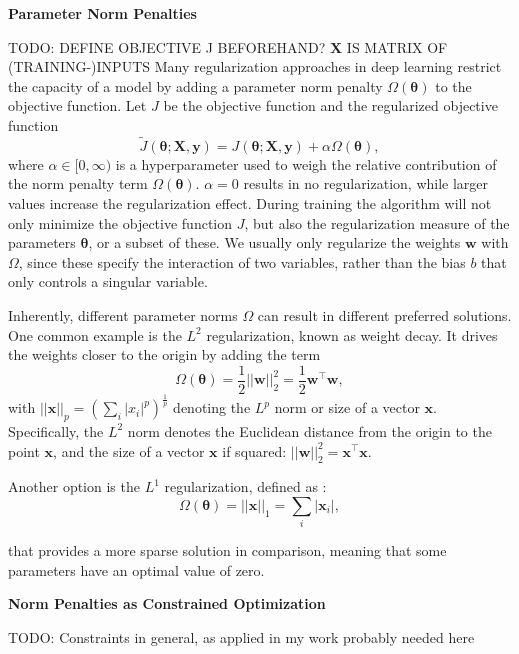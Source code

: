 \textbf{Parameter Norm Penalties}\par
TODO: DEFINE OBJECTIVE J BEFOREHAND? $\mathbf{X}$ IS MATRIX OF (TRAINING-)INPUTS
Many regularization approaches in deep learning restrict the capacity of a model by adding a parameter norm penalty $\Omega(\boldsymbol{\theta})$ to the objective function. Let $J$ be the objective function and the regularized objective function
\begin{equation}
    \tilde{J}(\boldsymbol{\theta}; \mathbf{X}, \mathbf{y}) = J(\boldsymbol{\theta}; \mathbf{X}, \mathbf{y}) + \alpha\Omega(\boldsymbol{\theta}),
\end{equation}
where $\alpha \in [0,\infty)$ is a hyperparameter used to weigh the relative contribution of the norm penalty term $\Omega(\boldsymbol{\theta})$. $\alpha=0$ results in no regularization, while larger values increase the regularization effect. During training the algorithm will not only minimize the objective function $J$, but also the regularization measure of the parameters $\boldsymbol{\theta}$, or a subset of these. We usually only regularize the weights $\mathbf{w}$ with $\Omega$, since these specify the interaction of two variables, rather than the bias $b$ that only controls a singular variable.

Inherently, different parameter norms $\Omega$ can result in different preferred solutions. One common example is the $L^2$ regularization, known as weight decay. It drives the weights closer to the origin by adding the term
\begin{equation}
    \Omega(\boldsymbol{\theta}) = \frac{1}{2}||\mathbf{w}||_2^2 = \frac{1}{2}\mathbf{w}^\top \mathbf{w},
\end{equation}
with $||\mathbf{x}||_p = (\sum_i |x_i|^p)^\frac{1}{p}$ denoting the $L^p$ norm or size of a vector $\mathbf{x}$. Specifically, the $L^2$ norm denotes the Euclidean distance from the origin to the point $\mathbf{x}$, and the size of a vector $\mathbf{x}$ if squared: $||\mathbf{w}||_2^2 = \mathbf{x}^\top \mathbf{x}$.

Another option is the $L^1$ regularization, defined as :
\begin{equation}
    \Omega(\boldsymbol{\theta}) = ||\mathbf{x}||_1 = \sum_i |\mathbf{x}_i|,
\end{equation}

that provides a more sparse solution in comparison, meaning that some parameters have an optimal value of zero. \bigskip

\textbf{Norm Penalties as Constrained Optimization}\par
TODO: Constraints in general, as applied in my work probably needed here \bigskip

